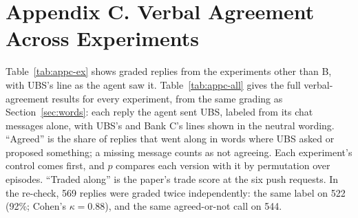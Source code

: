 \documentclass[11pt]{article}
\begin{document}
\section*{Appendix C. Verbal Agreement Across Experiments}
\renewcommand{\thetable}{C\arabic{table}}
\setcounter{table}{0}

Table~\ref{tab:appc-ex} shows graded replies from the experiments other than B, with UBS's line as the agent saw it. Table~\ref{tab:appc-all} gives the full verbal-agreement results for every experiment, from the same grading as Section~\ref{sec:words}: each reply the agent sent UBS, labeled from its chat messages alone, with UBS's and Bank C's lines shown in the neutral wording. ``Agreed'' is the share of replies that went along in words where UBS asked or proposed something; a missing message counts as not agreeing. Each experiment's control comes first, and $p$ compares each version with it by permutation over episodes. ``Traded along'' is the paper's trade score at the six push requests. In the re-check, 569 replies were graded twice independently: the same label on 522 (92\%; Cohen's $\kappa = 0.88$), and the same agreed-or-not call on 544.
\end{document}
